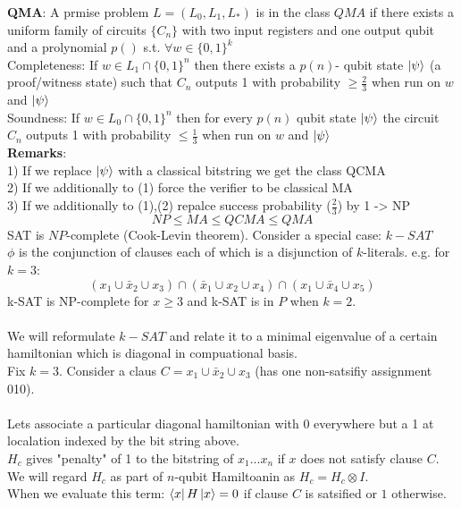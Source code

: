 \documentclass{article}
\begin{document}
\textbf{QMA}: A prmise problem $L = (L_0,L_1,L_*)$ is in the class $QMA$ if there exists a uniform family of circuits $\{C_n\}$ with two input registers and one output qubit and a prolynomial $p()$ s.t. $\forall w \in \{0,1\}^k$\\
Completeness: If $w \in L_1 \cap \{0,1\}^n$ then there exists a $p(n)$- qubit state $\ket{\psi}$ (a proof/witness state) such that $C_n$ outputs 1 with probability $\geq \frac{2}{3}$ when run on $w$ and $\ket{\psi}$\\
Soundness: If $w \in L_0 \cap \{0,1\}^n$ then for every $p(n)$ qubit state $\ket{\psi}$ the circuit $C_n$ outputs 1 with probability $\leq \frac{1}{3}$ when run on $w$ and $\ket{\psi}$\\
\textbf{Remarks}:\\
1) If we replace $\ket{\psi}$ with a classical bitstring we get the class QCMA\\
2) If we additionally to (1) force the verifier to be classical MA\\
3) If we additionally to (1),(2) repalce success probability ($\frac{2}{3}$) by 1 -> NP
$$
NP \leq MA \leq QCMA \leq QMA
$$
SAT is $NP$-complete (Cook-Levin theorem). Consider a special case: $k-SAT$\\
$\phi$ is the conjunction of clauses each of which is a disjunction of $k$-literals. e.g. for $k=3$:
$$
( x_1 \cup \bar x_2 \cup x_3) \cap ( \bar x_1 \cup x_2 \cup x_4) \cap (x_1 \cup \bar x_4 \cup x_5)
$$
k-SAT is NP-complete for $x \geq 3$ and k-SAT is in $P$ when $k=2$.\\\\
We will reformulate $k-SAT$ and relate it to a minimal eigenvalue of a certain hamiltonian which is diagonal in compuational basis.\\
Fix $k=3$. Consider a claus $C = x_1 \cup \bar x_2 \cup x_3$ (has one non-satsifiy assignment 010).\\\\
               Lets associate a particular diagonal hamiltonian with 0 everywhere but a 1 at localation indexed by the bit string above.\\
               $H_c$ gives "penalty" of 1 to the bitstring of $x_1...x_n$ if $x$ does not satisfy clause $C$.\\
               We will regard $H_c$ as part of $n$-qubit Hamiltoanin as $H_c = H_c \otimes I$.\\
               When we evaluate this term: $\bra{x} H \ket{x} = 0$ if clause $C$ is satsified or $1$ otherwise.\\\\
\end{document}
